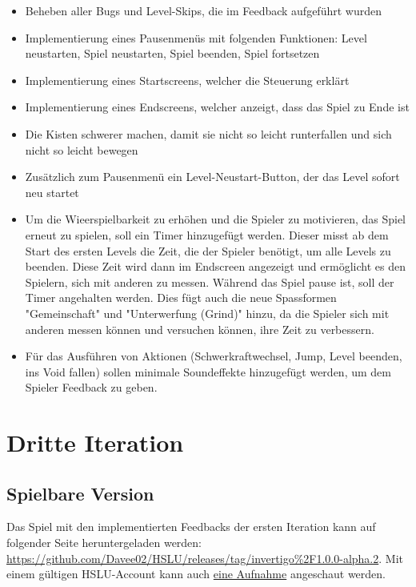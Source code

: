 \documentclass{article}
\begin{document}
\begin{itemize}
    \item Beheben aller Bugs und Level-Skips, die im Feedback aufgeführt wurden
    \item Implementierung eines Pausenmenüs mit folgenden Funktionen: Level neustarten, Spiel neustarten, Spiel beenden, Spiel fortsetzen
    \item Implementierung eines Startscreens, welcher die Steuerung erklärt
    \item Implementierung eines Endscreens, welcher anzeigt, dass das Spiel zu Ende ist
    \item Die Kisten schwerer machen, damit sie nicht so leicht runterfallen und sich nicht so leicht bewegen
    \item Zusätzlich zum Pausenmenü ein Level-Neustart-Button, der das Level sofort neu startet
    \item Um die Wieerspielbarkeit zu erhöhen und die Spieler zu motivieren, das Spiel erneut zu spielen, soll ein Timer hinzugefügt werden. Dieser misst ab dem Start des ersten Levels
    die Zeit, die der Spieler benötigt, um alle Levels zu beenden. Diese Zeit wird dann im Endscreen angezeigt und ermöglicht es den Spielern, sich mit anderen zu messen. Während das Spiel
    pause ist, soll der Timer angehalten werden. Dies fügt auch die neue Spassformen "Gemeinschaft" und "Unterwerfung (Grind)" hinzu, da die Spieler sich mit anderen messen können und
    versuchen können, ihre Zeit zu verbessern.
    \item Für das Ausführen von Aktionen (Schwerkraftwechsel, Jump, Level beenden, ins Void fallen) sollen minimale Soundeffekte hinzugefügt werden, um dem Spieler Feedback zu geben.
\end{itemize}

\newpage

\section{Dritte Iteration}

\subsection{Spielbare Version}

Das Spiel mit den implementierten Feedbacks der ersten Iteration kann auf folgender Seite heruntergeladen werden: \url{https://github.com/Davee02/HSLU/releases/tag/invertigo%2F1.0.0-alpha.2}.
Mit einem gültigen HSLU-Account kann auch \href{www.todo.ch}{eine Aufnahme}
angeschaut werden.
\end{document}
